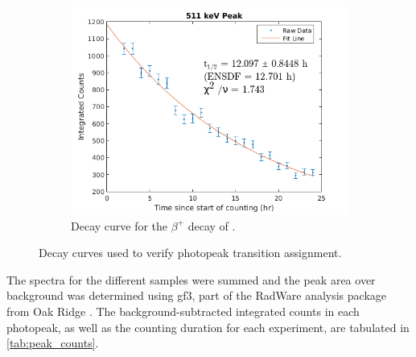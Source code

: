 \documentclass[5p]{elsarticle}
\begin{document}
\begin{figure}
     \begin{subfigure}[t]{0.49\textwidth}
        \centering
        \includegraphics[scale=0.6]{./figures/511keV_curve2.png}
        \caption{ Decay curve for the $\beta^+$ decay of .}
        \label{fig:decay_curve_511}
    \end{subfigure}%
    \caption{Decay curves used to verify photopeak transition assignment.}
     \label{fig:decay_curves}
\end{figure}

The spectra for the different samples were summed and the peak area over background was determined using gf3, part of the RadWare analysis package from Oak Ridge   \cite{radford2000radware, Radford1995}. The background-subtracted integrated counts in each photopeak, as well as the counting duration for each experiment, are tabulated in \autoref{tab:peak_counts}.
\end{document}
